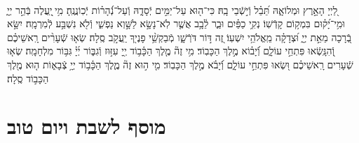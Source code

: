 \documentclass[twoside, openany, parskip=half, 11pt]{book}
\begin{document}
\begin{sometimes}

\\
%
לַ֭יְיָ הָאָ֣רֶץ וּמְלוֹאָ֑הּ תֵּ֝בֵ֗ל וְֿי֣שְֿׁבֵי בָֽהּ׃
כִּי־ה֖וּא עַל־יַמִּ֣ים יְֿסָדָ֑הּ וְֿעַל־נְֿ֝הָר֗וֹת יְֿכֽוֹנֲנֶֽהָ׃
מִ֥י ֖יַֽעֲלֶה בְּֿהַ֣ר יְיָ֑ וּמִ֥י־יָ֝ק֗וּם בִּמְק֥וֹם קָדְֿשֽׁוֹ׃
נְקִ֥י כַפַּ֗יִם וּבַ֢ר לֵ֫בָ֥ב אֲשֶׁ֤ר לֹֽא־נָשָׂ֣א לַשָּׁ֣וְא נַפְשִׁ֑י וְֿלֹ֖א נִשְׁבַּ֣ע לְֿמִרְמָֽה׃
יִשָּׂ֣א בְֿ֭רָכָה מֵאֵ֣ת יְיָ֑ וּ֝צְדָקָ֗ה מֵֽאֱלֹהֵ֥י יִשְׁעֽוֹ׃
זֶ֭ה דּ֣וֹר דֹּרְֿשָׁ֑ו מְֿבַקְשֵׁ֥֨י פָנֶי֖ךָ יַֽעֲקֹ֣ב סֶֽלָה׃
שְׂא֤וּ שְֿׁעָרִ֨ים רָֽאשֵׁיכֶ֗ם וְֿ֭הִנָּֽשְֿׂאוּ פִּתְחֵ֣י עוֹלָ֑ם וְֿ֝יָב֗וֹא מֶ֣לֶךְ הַכָּבֽוֹד׃
מִ֥י זֶה֘ מֶ֤לֶךְ הַכָּ֫ב֥וֹד יְ֖יָ עִזּ֣וּז וְֿגִבּ֑וֹר יְ֜יָ֗ גִּבּ֥וֹר מִלְחָמָֽה׃
שְׂא֤וּ שְֿׁעָרִים רָֽאשֵׁיכֶ֗ם וּ֭שְׂאוּ פִּתְחֵ֣י עוֹלָ֑ם וְֿ֝יָבֹ֗א מֶ֣לֶךְ הַכָּבֽוֹד׃
מִ֤י ה֣וּא זֶה֘ מֶ֢לֶךְ הַכָּ֫ב֥וֹד יְיָ֥ צְֿבָא֑וֹת ה֤וּא מֶ֖לֶךְ הַכָּב֣וֹד סֶֽלָה׃

\end{sometimes}



\etzchaim

\halfkaddish


\nextpage

\chapter[מוסף לשבת ויו״ט]{ מוסף לשבת ויום טוב }

\amidaopening{\shabbosshuva}{}
\nextpage

\end{document}
